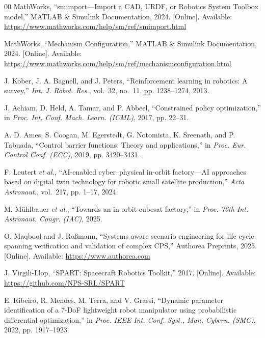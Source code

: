\documentclass{ieeeaccess}
\begin{document}
\begin{thebibliography}{00}
MathWorks, ``smimport---Import a CAD, URDF, or Robotics System Toolbox model,'' MATLAB \& Simulink Documentation,
2024. [Online]. Available: \url{https://www.mathworks.com/help/sm/ref/smimport.html}



MathWorks, ``Mechanism Configuration,'' MATLAB \& Simulink Documentation, 2024. [Online]. Available: \url{https://www.mathworks.com/help/sm/ref/mechanismconfiguration.html}



J. Kober, J. A. Bagnell, and J. Peters, ``Reinforcement learning in robotics: A survey,''
\emph{Int. J. Robot. Res.}, vol.~32, no.~11, pp. 1238--1274, 2013.



J. Achiam, D. Held, A. Tamar, and P. Abbeel, ``Constrained policy optimization,'' in \emph{Proc. Int. Conf. Mach. Learn. (ICML)},
2017, pp. 22--31.



A. D. Ames, S. Coogan, M. Egerstedt, G. Notomista, K. Sreenath, and P. Tabuada,
``Control barrier functions: Theory and applications,'' in \emph{Proc. Eur. Control Conf. (ECC)}, 2019, pp.
3420--3431.



F. Leutert \emph{et al.}, ``AI-enabled cyber--physical in-orbit factory---AI approaches based on digital twin technology
for robotic small satellite production,'' \emph{Acta Astronaut.}, vol.~217, pp. 1--17, 2024.



M. M{\"u}hlbauer \emph{et al.}, ``Towards an in-orbit cubesat factory,'' in \emph{Proc. 76th Int. Astronaut. Congr. (IAC)},
2025.



O. Maqbool and J. Roßmann, ``Systems aware scenario engineering for life cycle-spanning verification and
validation of complex CPS,'' Authorea Preprints, 2025. [Online]. Available: \url{https://www.authorea.com}



J. Virgili-Llop, ``SPART: Spacecraft Robotics Toolkit,'' 2017. [Online]. Available: \url{https://github.com/NPS-SRL/SPART}



E. Ribeiro, R. Mendes, M. Terra, and V. Grassi, ``Dynamic parameter identification of a
7-DoF lightweight robot manipulator using probabilistic differential optimization,'' in \emph{Proc. IEEE Int. Conf. Syst., Man, Cybern. (SMC)},
2022, pp. 1917--1923.




\end{thebibliography}
\end{document}
